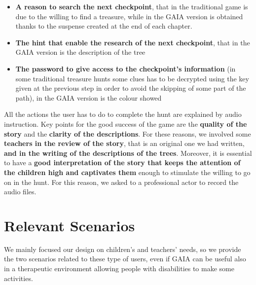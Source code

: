\documentclass[a4paper,11pt]{report}
\begin{document}
\begin{itemize}
	\item \textbf{A reason to search the next checkpoint}, that in the traditional game is due to the willing to find a treasure, while in the GAIA version is obtained thanks to the suspense created at the end of each chapter.
	\item \textbf{The hint that enable the research of the next checkpoint}, that in the GAIA version is the description of the tree
	\item \textbf{The password to give access to the checkpoint’s information} (in some traditional treasure hunts some clues has to be decrypted using the key given at the previous step in order to avoid the skipping of some part of the path), in the GAIA version is the colour showed 
\end{itemize}
All the actions the user has to do to complete the hunt are explained by audio instruction. Key points for the good success of the game are the \textbf{quality of the story} and the \textbf{clarity of the descriptions}. For these reasons, we involved some \textbf{teachers in the review of the story}, that is an original one we had written, \textbf{and in the writing of the descriptions of the trees}. Moreover, it is essential to have a \textbf{good interpretation of the story that keeps the attention of the children high and captivates them} enough to stimulate the willing to go on in the hunt. For this reason, we asked to a professional actor to record the audio files.
\section{Relevant Scenarios}
We mainly focused our design on children’s and teachers’ needs, so we provide the two scenarios related to these type of users, even if GAIA can be useful also in a therapeutic environment allowing people with disabilities to make some activities.
\end{document}
